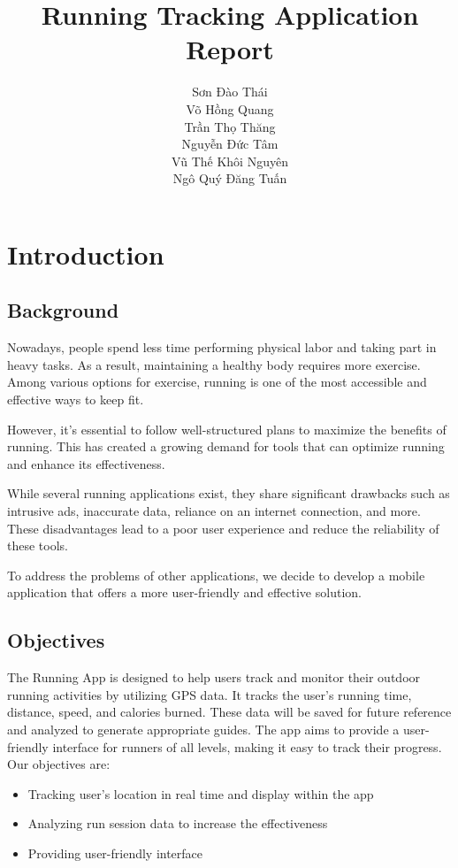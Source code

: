 \documentclass{article}
\title{Running Tracking Application Report}
\author{Sơn Đào Thái \\ Võ Hồng Quang \\ Trần Thọ Thăng \\ Nguyễn Đức Tâm \\Vũ Thế Khôi Nguyên \\ Ngô Quý Đăng Tuấn}
\date{}
\begin{document}
\maketitle

\newpage

\section{Introduction}

\subsection{Background}

    Nowadays, people spend less time performing physical labor and taking part in heavy tasks. As a result, maintaining a healthy body requires more exercise. Among various options for exercise, running is one of the most accessible and effective ways to keep fit. 

    However, it's essential to follow well-structured plans to maximize the benefits of running. This has created a growing demand for tools that can optimize running and enhance its effectiveness.

    While several running applications exist, they share significant drawbacks such as intrusive ads, inaccurate data, reliance on an internet connection, and more. These disadvantages lead to a poor user experience and reduce the reliability of these tools.

    To address the problems of other applications, we decide to develop a mobile application that offers a more user-friendly and effective solution.

\subsection{Objectives}

    The Running App is designed to help users track and monitor their outdoor running activities by utilizing GPS data. It tracks the user's running time, distance, speed, and calories burned. These data will be saved for future reference and analyzed to generate appropriate guides. The app aims to provide a user-friendly interface for runners of all levels, making it easy to track their progress.
    Our objectives are:
    \begin{itemize}
        \item Tracking user's location in real time and display within the app
        \item Analyzing run session data to increase the effectiveness
        \item Providing user-friendly interface
    \end{itemize}
\end{document}
